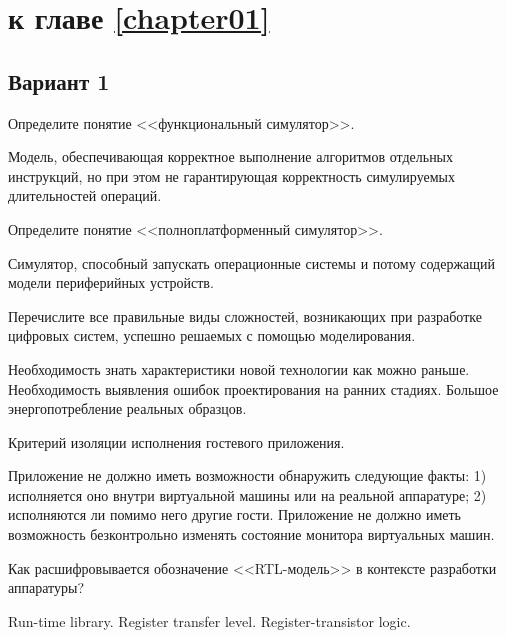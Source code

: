 \section{\Questions к главе \ref{chapter01}} %

\subsection*{Вариант 1}

\begin{questions}

\question[5] Определите понятие <<функциональный симулятор>>.
\begin{solution}[2cm]
Модель, обеспечивающая корректное выполнение алгоритмов отдельных инструкций, но при этом не гарантирующая корректность симулируемых длительностей операций.
\end{solution}


\question[5] Определите понятие <<полноплатформенный симулятор>>.
\begin{solution}[2cm]
Симулятор,  способный запускать операционные системы и потому содержащий модели периферийных устройств.
\end{solution}

\question[3] Перечислите все правильные виды сложностей, возникающих при разработке цифровых систем, успешно решаемых с помощью моделирования.
\begin{choices}
\correctchoice Необходимость знать характеристики новой технологии как можно раньше.
\correctchoice Необходимость выявления ошибок проектирования на ранних стадиях.
\choice Большое энергопотребление реальных образцов.
\end{choices}

\question[3] Критерий изоляции исполнения гостевого приложения.
\begin{solution}[1cm]
Приложение не должно иметь возможности обнаружить следующие факты: 1) исполняется оно внутри виртуальной машины или на реальной аппаратуре; 2) исполняются ли помимо него другие гости. Приложение не должно иметь возможность безконтрольно изменять состояние монитора виртуальных машин.
\end{solution}

\question[3] Как расшифровывается обозначение <<RTL-модель>> в контексте разработки аппаратуры?
\begin{choices}
\choice Run-time library.
\correctchoice Register transfer level.
\choice Register-transistor logic.
\end{choices}


\end{questions}
